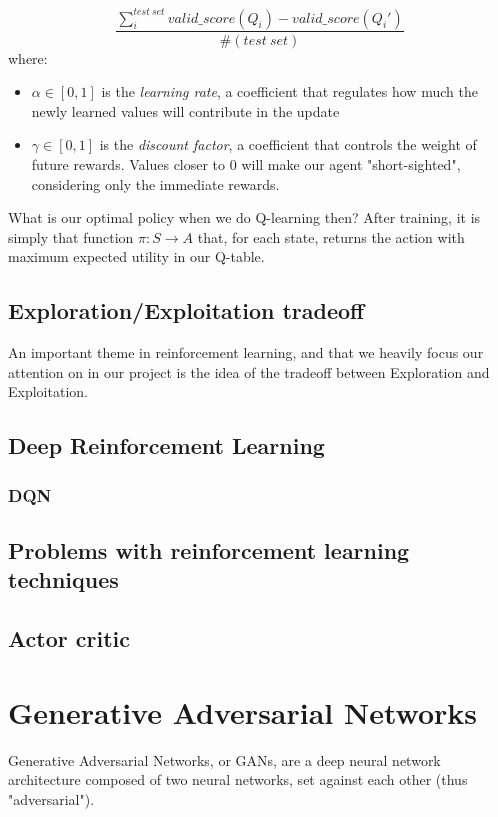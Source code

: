    \[\frac{\sum_{i}^{test~set} valid\_score(Q_i) - valid\_score(Q_i')}{\#(test~set)}\]
where:
\begin{itemize}
	\item $\alpha\in[0,1]$ is the \emph{learning rate}, a coefficient that regulates how much the newly learned values will contribute in the update
	\item $\gamma\in[0,1]$ is the \emph{discount factor}, a coefficient that controls the weight of future rewards. Values closer to 0 will make our agent "short-sighted", considering only the immediate rewards.
\end{itemize}

What is our optimal policy when we do Q-learning then? After training, it is simply that function $\pi: S \to A$ that, for each state, returns the action with maximum expected utility in our Q-table.

\subsection{Exploration/Exploitation tradeoff}
An important theme in reinforcement learning, and that we heavily focus our attention on in our project is the idea of the tradeoff between Exploration and Exploitation.

\subsection{Deep Reinforcement Learning}
\subsubsection{DQN}
\subsection{Problems with reinforcement learning techniques}
\subsection{Actor critic}


\section{Generative Adversarial Networks}
\label{sec:gan}
Generative Adversarial Networks, or GANs, are a deep neural network architecture composed of two neural networks, set against each other (thus "adversarial").

